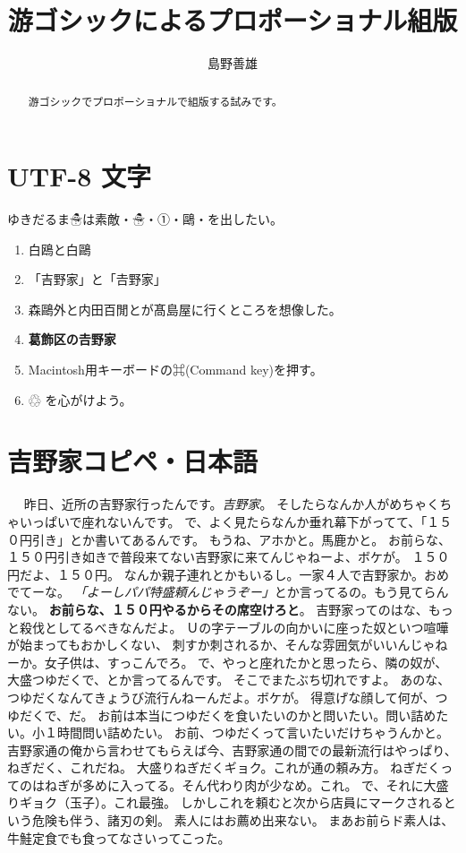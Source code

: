 \documentclass[14pt,a4paper]{ltjsarticle}
\title{游ゴシックによるプロポーショナル組版}
\author{島野善雄}
\begin{document}
\maketitle
\tableofcontents

\begin{abstract}
  游ゴシックでプロポーショナルで組版する試みです。
\end{abstract}
\section{UTF-8 文字}
ゆきだるま☃は素敵・☃・①・鷗・を出したい。

\begin{enumerate}
\item 白鴎と白鷗
\item「吉野家」と「𠮷野家」
\item 森鷗外と内田百閒とが髙島屋に行くところを想像した。
\item \textbf{葛飾区の𠮷野家}
\item Macintosh用キーボードの⌘(Command key)を押す。
\item ♲ を心がけよう。
\end{enumerate}


\section{吉野家コピペ・日本語}
　
昨日、近所の吉野家行ったんです。\emph{吉野家}。 
そしたらなんか人がめちゃくちゃいっぱいで座れないんです。 
で、よく見たらなんか垂れ幕下がってて、「１５０円引き」とか書いてあるんです。 
もうね、アホかと。馬鹿かと。 
お前らな、１５０円引き如きで普段来てない吉野家に来てんじゃねーよ、ボケが。 
１５０円だよ、１５０円。 
なんか親子連れとかもいるし。一家４人で吉野家か。おめでてーな。 
\emph{「よーしパパ特盛頼んじゃうぞー」}とか言ってるの。もう見てらんない。 
\textbf{お前らな、１５０円やるからその席空けろと}。 
吉野家ってのはな、もっと殺伐としてるべきなんだよ。 
Ｕの字テーブルの向かいに座った奴といつ喧嘩が始まってもおかしくない、 
刺すか刺されるか、そんな雰囲気がいいんじゃねーか。女子供は、すっこんでろ。 
で、やっと座れたかと思ったら、隣の奴が、大盛つゆだくで、とか言ってるんです。 
そこでまたぶち切れですよ。 
あのな、つゆだくなんてきょうび流行んねーんだよ。ボケが。 
得意げな顔して何が、つゆだくで、だ。 
お前は本当につゆだくを食いたいのかと問いたい。問い詰めたい。小１時間問い詰めたい。 
お前、つゆだくって言いたいだけちゃうんかと。 
吉野家通の俺から言わせてもらえば今、吉野家通の間での最新流行はやっぱり、 
ねぎだく、これだね。 
大盛りねぎだくギョク。これが通の頼み方。 
ねぎだくってのはねぎが多めに入ってる。そん代わり肉が少なめ。これ。 
で、それに大盛りギョク（玉子）。これ最強。 
しかしこれを頼むと次から店員にマークされるという危険も伴う、諸刃の剣。 
素人にはお薦め出来ない。 
まあお前らド素人は、牛鮭定食でも食ってなさいってこった。 
\end{document}
